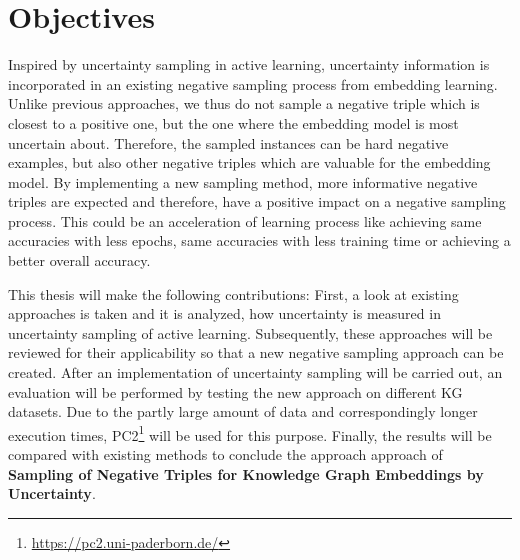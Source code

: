 \section{Objectives}
\label{sec:objectives}

Inspired by uncertainty sampling in active learning,  uncertainty information is incorporated in an existing negative sampling process from embedding learning.
Unlike previous approaches, we thus do not sample a negative triple which is closest to a positive one, but the one where the embedding model is most uncertain about.
Therefore, the sampled instances can be hard negative examples, but also other negative triples which are valuable for the embedding model.
By implementing a new sampling method, more informative negative triples are expected and therefore, have a positive impact on a negative sampling process.
This could be an acceleration of learning process like achieving same accuracies with less epochs, same accuracies with less training time or achieving a better overall accuracy.

This thesis will make the following contributions:
First, a look at existing approaches is taken and it is analyzed, how uncertainty is measured in uncertainty sampling of active learning.
Subsequently, these approaches will be reviewed for their applicability so that a new negative sampling approach can be created.
After an implementation of uncertainty sampling will be carried out, an evaluation will be performed by testing the new approach on different \ac{KG} datasets.
Due to the partly large amount of data and correspondingly longer execution times, \ac{PC2}\footnote{\url{https://pc2.uni-paderborn.de/}} will be used for this purpose.
Finally, the results will be compared with existing methods to conclude the approach approach of \textbf{Sampling of Negative Triples for Knowledge Graph Embeddings by Uncertainty}.









